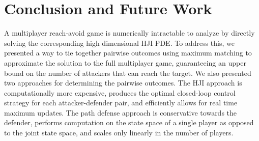 \section{Conclusion and Future Work}
\label{sec:conclusion}
A multiplayer reach-avoid game is numerically intractable to analyze by directly solving the corresponding high dimensional HJI PDE. To address this, we presented a way to tie together pairwise outcomes using maximum matching to approximate the solution to the full multiplayer game, guaranteeing an upper bound on the number of attackers that can reach the target. We also presented two approaches for determining the pairwise outcomes. The HJI approach is computationally more expensive, produces the optimal closed-loop control strategy for each attacker-defender pair, and efficiently allows for real time maximum updates. The path defense approach is conservative towards the defender, performs computation on the state space of a single player as opposed to the joint state space, and scales only linearly in the number of players.
